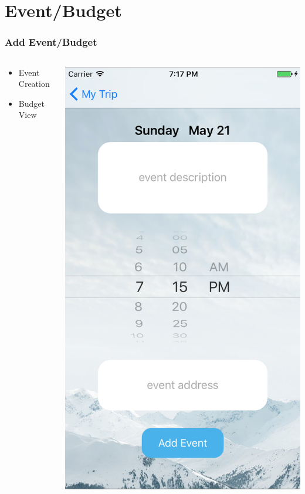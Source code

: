 \documentclass{beamer}
\begin{document}
\section{Event/Budget}
\begin{frame}
\frametitle{Add Event/Budget}
\begin{columns}
    \begin{column}{0.3\textwidth}
        \begin{itemize}
            \item Event Creation
            \item Budget View
        \end{itemize}
    \end{column}
    \begin{column}{0.3\textwidth}  %
        \begin{center}
            \includegraphics[scale=0.3]{addEvent}

\end{center}
\end{column}
\end{columns}
\end{frame}
\end{document}
